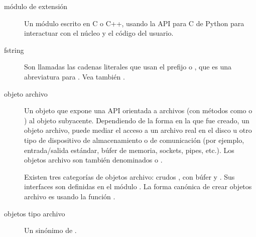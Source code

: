 \documentclass[a4,10pt,spanish]{sphinxmanual}
\begin{document}
\begin{description}
\item[{módulo de extensión\label{\detokenize{glossary:term-extension-module}}}] \leavevmode
\sphinxAtStartPar
Un módulo escrito en C o C++, usando la API para C de Python para interactuar con el núcleo y el código del usuario.

\item[{f\sphinxhyphen{}string\label{\detokenize{glossary:term-f-string}}}] \leavevmode
\sphinxAtStartPar
Son llamadas  las cadenas literales que usan el prefijo  o , que es una abreviatura para  .  Vea también .

\item[{objeto archivo\label{\detokenize{glossary:term-file-object}}}] \leavevmode
\sphinxAtStartPar
Un objeto que expone una API orientada a archivos (con métodos como  o ) al objeto subyacente.  Dependiendo de la forma en la que fue creado, un objeto archivo, puede mediar el acceso a un archivo real en el disco u otro tipo de dispositivo de almacenamiento o de comunicación (por ejemplo, entrada/salida estándar, búfer de memoria, sockets, pipes, etc.).  Los objetos archivo son también denominados  o .

\sphinxAtStartPar
Existen tres categorías de objetos archivo: crudos  {\hyperref[\detokenize{glossary:term-binary-file}]{}}, con búfer {\hyperref[\detokenize{glossary:term-binary-file}]{}} y {\hyperref[\detokenize{glossary:term-text-file}]{}}.  Sus interfaces son definidas en el módulo .  La forma canónica de crear objetos archivo es usando la función .

\item[{objetos tipo archivo\label{\detokenize{glossary:term-file-like-object}}}] \leavevmode
\sphinxAtStartPar
Un sinónimo de {\hyperref[\detokenize{glossary:term-file-object}]{}}.


\end{description}
\end{document}
